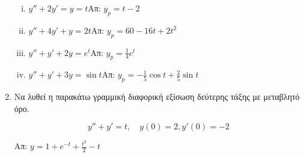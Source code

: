 \begin{enumerate}
    \begin{enumerate}[i)]
      \item $y''+2y'=y=t$\hfill Απ: $y_p=t-2$
      \item $y''+4y'+y=2t$\hfill Απ: $y_p=60-16t+2t^2$
      \item $y''+y'+2y=e^t$\hfill Απ: $y_p=\frac{1}{4}e^t$
      \item $y''+y'+3y=\sin t$\hfill Απ: $y_p=-\frac{1}{5}\cos t+\frac{2}{5}\sin t$
    \end{enumerate}

  \item Να λυθεί η παρακάτω γραμμική διαφορική εξίσωση δεύτερης τάξης με μεταβλητό όρο.

    \[y''+y'=t,\quad y(0)=2, y'(0)=-2\]

    \hfill Απ: $y=1+e^{-t}+\frac{t^2}{2}-t$

\end{enumerate}



